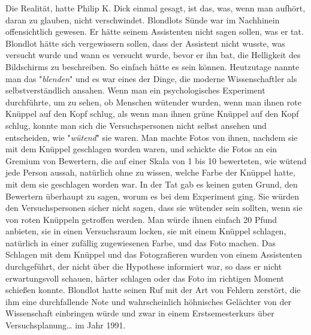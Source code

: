 {Die Realität, hatte Philip K. Dick einmal gesagt, ist das, was, wenn man aufhört, daran zu glauben, nicht verschwindet. Blondlots Sünde war im Nachhinein offensichtlich gewesen. Er hätte seinem Assistenten nicht sagen sollen, was er tat. Blondlot hätte sich vergewissern sollen, dass der Assistent nicht wusste, was versucht wurde und wann es versucht wurde, bevor er ihn bat, die Helligkeit des Bildschirms zu beschreiben. So einfach hätte es sein können. Heutzutage nannte man das "\emph{blenden}" und es war eines der Dinge, die moderne Wissenschaftler als selbstverständlich ansahen. Wenn man ein psychologisches Experiment durchführte, um zu sehen, ob Menschen wütender wurden, wenn man ihnen rote Knüppel auf den Kopf schlug, als wenn man ihnen grüne Knüppel auf den Kopf schlug, konnte man sich die Versuchspersonen nicht selbst ansehen und entscheiden, wie "\emph{wütend}" sie waren. Man machte Fotos von ihnen, nachdem sie mit dem Knüppel geschlagen worden waren, und schickte die Fotos an ein Gremium von Bewertern, die auf einer Skala von 1 bis 10 bewerteten, wie wütend jede Person aussah, natürlich ohne zu wissen, welche Farbe der Knüppel hatte, mit dem sie geschlagen worden war. In der Tat gab es keinen guten Grund, den Bewertern überhaupt zu sagen, worum es bei dem Experiment ging. Sie würden den Versuchspersonen sicher nicht sagen, dass sie wütender sein sollten, wenn sie von roten Knüppeln getroffen werden. Man würde ihnen einfach 20 Pfund anbieten, sie in einen Versuchsraum locken, sie mit einem Knüppel schlagen, natürlich in einer zufällig zugewiesenen Farbe, und das Foto machen. Das Schlagen mit dem Knüppel und das Fotografieren wurden von einem Assistenten durchgeführt, der nicht über die Hypothese informiert war, so dass er nicht erwartungsvoll schauen, härter schlagen oder das Foto im richtigen Moment schießen konnte. Blondlot hatte seinen Ruf mit der Art von Fehlern zerstört, die ihm eine durchfallende Note und wahrscheinlich höhnisches Gelächter von der Wissenschaft einbringen würde und zwar in einem Erstsemesterkurs über Versuchsplanung… im Jahr 1991.

}
